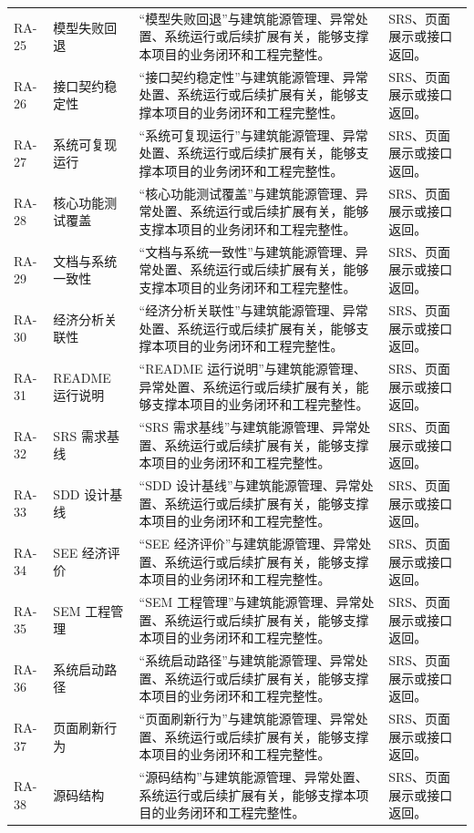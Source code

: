 \documentclass[12pt,a4paper]{ctexart}
\begin{document}
\begin{longtable}{L{1.7cm}L{4.4cm}L{6.0cm}L{3.4cm}}
RA-25 & 模型失败回退 & “模型失败回退”与建筑能源管理、异常处置、系统运行或后续扩展有关，能够支撑本项目的业务闭环和工程完整性。 & SRS、页面展示或接口返回。 \\
RA-26 & 接口契约稳定性 & “接口契约稳定性”与建筑能源管理、异常处置、系统运行或后续扩展有关，能够支撑本项目的业务闭环和工程完整性。 & SRS、页面展示或接口返回。 \\
RA-27 & 系统可复现运行 & “系统可复现运行”与建筑能源管理、异常处置、系统运行或后续扩展有关，能够支撑本项目的业务闭环和工程完整性。 & SRS、页面展示或接口返回。 \\
RA-28 & 核心功能测试覆盖 & “核心功能测试覆盖”与建筑能源管理、异常处置、系统运行或后续扩展有关，能够支撑本项目的业务闭环和工程完整性。 & SRS、页面展示或接口返回。 \\
RA-29 & 文档与系统一致性 & “文档与系统一致性”与建筑能源管理、异常处置、系统运行或后续扩展有关，能够支撑本项目的业务闭环和工程完整性。 & SRS、页面展示或接口返回。 \\
RA-30 & 经济分析关联性 & “经济分析关联性”与建筑能源管理、异常处置、系统运行或后续扩展有关，能够支撑本项目的业务闭环和工程完整性。 & SRS、页面展示或接口返回。 \\
RA-31 & README 运行说明 & “README 运行说明”与建筑能源管理、异常处置、系统运行或后续扩展有关，能够支撑本项目的业务闭环和工程完整性。 & SRS、页面展示或接口返回。 \\
RA-32 & SRS 需求基线 & “SRS 需求基线”与建筑能源管理、异常处置、系统运行或后续扩展有关，能够支撑本项目的业务闭环和工程完整性。 & SRS、页面展示或接口返回。 \\
RA-33 & SDD 设计基线 & “SDD 设计基线”与建筑能源管理、异常处置、系统运行或后续扩展有关，能够支撑本项目的业务闭环和工程完整性。 & SRS、页面展示或接口返回。 \\
RA-34 & SEE 经济评价 & “SEE 经济评价”与建筑能源管理、异常处置、系统运行或后续扩展有关，能够支撑本项目的业务闭环和工程完整性。 & SRS、页面展示或接口返回。 \\
RA-35 & SEM 工程管理 & “SEM 工程管理”与建筑能源管理、异常处置、系统运行或后续扩展有关，能够支撑本项目的业务闭环和工程完整性。 & SRS、页面展示或接口返回。 \\
RA-36 & 系统启动路径 & “系统启动路径”与建筑能源管理、异常处置、系统运行或后续扩展有关，能够支撑本项目的业务闭环和工程完整性。 & SRS、页面展示或接口返回。 \\
RA-37 & 页面刷新行为 & “页面刷新行为”与建筑能源管理、异常处置、系统运行或后续扩展有关，能够支撑本项目的业务闭环和工程完整性。 & SRS、页面展示或接口返回。 \\
RA-38 & 源码结构 & “源码结构”与建筑能源管理、异常处置、系统运行或后续扩展有关，能够支撑本项目的业务闭环和工程完整性。 & SRS、页面展示或接口返回。 \\

\end{longtable}
\end{document}
